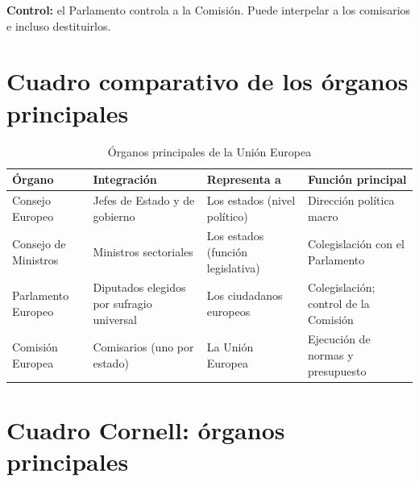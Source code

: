 \documentclass[12pt,oneside]{book}
\begin{document}
\textbf{Control:} el Parlamento controla a la Comisión. Puede interpelar a los comisarios e incluso destituirlos.

\section{Cuadro comparativo de los órganos principales}

\begin{table}[H]
\centering
\caption{Órganos principales de la Unión Europea}
\small
\begin{tabularx}{\textwidth}{@{}P{2.6cm}YYY@{}}
\toprule
\textbf{Órgano} & \textbf{Integración} & \textbf{Representa a} & \textbf{Función principal} \\
\midrule
Consejo Europeo & Jefes de Estado y de gobierno & Los estados (nivel político) & Dirección política macro \\
Consejo de Ministros & Ministros sectoriales & Los estados (función legislativa) & Colegislación con el Parlamento \\
Parlamento Europeo & Diputados elegidos por sufragio universal & Los ciudadanos europeos & Colegislación; control de la Comisión \\
Comisión Europea & Comisarios (uno por estado) & La Unión Europea & Ejecución de normas y presupuesto \\
\bottomrule
\end{tabularx}
\end{table}

\section{Cuadro Cornell: órganos principales}
\end{document}
